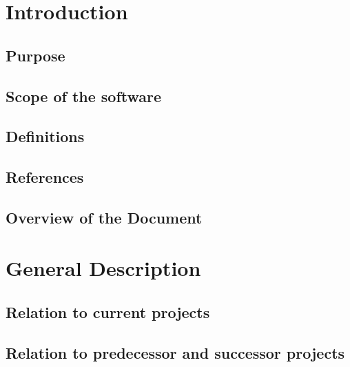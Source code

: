 \def\thedocument{System Requirements Document}
\def\thedate{DATE} %
\def\theversion{0.1}
\def\thestatus{Working copy}







\section{Introduction} %
  \label{sec:introduction}
  \subsection{Purpose}
    \label{sec:purpose}
    
  \subsection{Scope of the software}
    \label{sec:scope_of_the_software}
    
  \subsection{Definitions}
    \label{sec:definitions}
    
  \subsection{References}
    \label{sec:references}
    
  \subsection{Overview of the Document}
    \label{sec:overview_of_the_document}
    

\section{General Description} %
  \label{sec:general_description}
  \subsection{Relation to current projects}
    \label{sec:relation_to_current_projects}
    
  \subsection{Relation to predecessor and successor projects}
    \label{sec:relation_to_predecessor_and_successor_projects}
    
